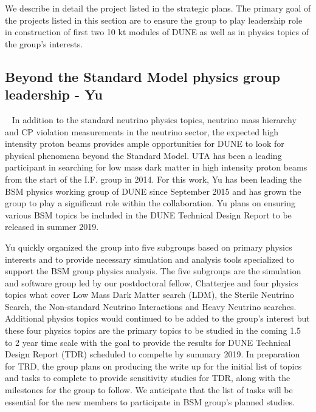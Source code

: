 \label{sec:IF_protoDUNE}
We describe in detail the project listed in the strategic plans.   The primary goal of the projects listed in this section are to ensure
the group to play leadership role in construction of first two 10 kt modules of DUNE as well as in physics topics of the group's 
interests.  
%
%

%
%

%
%
\subsection {Beyond the Standard Model physics group leadership - Yu}~\label{sec:dune-bsm}
In addition to the standard neutrino physics topics, neutrino mass hierarchy and CP violation measurements in the neutrino sector, the 
expected high intensity proton beams provides ample opportunities for DUNE to look for physical phenomena beyond the Standard Model. UTA has been a leading participant in searching for low mass dark matter in high intensity proton beams from the start of the I.F. group in 2014. For this work, Yu has been leading the BSM physics working group of DUNE since September 2015 and has grown the group to play a significant role within the collaboration. Yu plans on ensuring various BSM topics be included in the DUNE Technical Design Report to be released in summer 2019.

Yu quickly organized the group into five subgroups based on primary physics interests and to provide necessary
simulation and analysis tools specialized to support the BSM group physics analysis.
The five subgroups are the simulation and software group led by our postdoctoral fellow, Chatterjee and four physics topics what cover
Low Mass Dark Matter search (LDM), the Sterile Neutrino Search, the Non-standard Neutrino Interactions and Heavy Neutrino searches.
Additional physics topics would continued to be added to the group's interest but these four physics topics are the primary topics to be
studied in the coming 1.5 to 2 year time scale with the goal to provide the results for DUNE Technical Design Report (TDR) scheduled to compelte
by summary 2019.
In preparation for TRD, the group plans on producing the write up for the initial list of topics and tasks to complete to provide
sensitivity studies for TDR, along with the milestones for the group to follow.
We anticipate that the list of tasks will be essential for the new members to participate in BSM group's planned studies.
%
%
